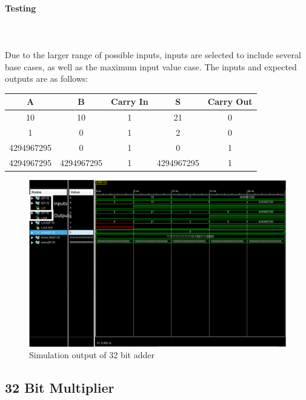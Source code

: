 \documentclass{article}
\begin{document}
    \paragraph{Testing}
    \hfill\\\\
    Due to the larger range of possible inputs, inputs are selected to include
    several base cases, as well as the maximum input value case. The inputs
    and expected outputs are as follows:

    \begin{center}
        \begin{tabular}{|c|c|c||c|c|}
            \hline
            A & B & Carry In & S & Carry Out
            \\\hline\hline
            10 & 10 & 1 & 21 & 0
            \\\hline
            1 & 0 & 1 & 2 & 0
            \\\hline
            4294967295 & 0 & 1 & 0 & 1
            \\\hline
            4294967295 & 4294967295 & 1 & 4294967295 & 1
            \\\hline
        \end{tabular}
    \end{center}

    \begin{figure}[H]
        \centering
        \includegraphics[width=0.9\paperwidth,center]{Screenshots/adder_32.png}
        \caption{Simulation output of 32 bit adder}
    \end{figure}



    \subsection{32 Bit Multiplier}
\end{document}

